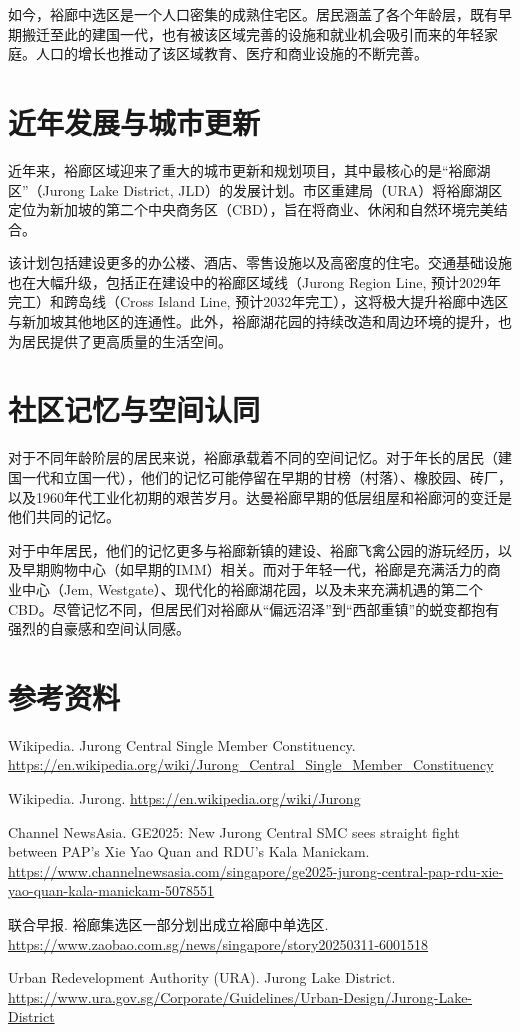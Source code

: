 \documentclass[11pt,a4paper,twoside,openany]{book}
\begin{document}
如今，裕廊中选区是一个人口密集的成熟住宅区。居民涵盖了各个年龄层，既有早期搬迁至此的建国一代，也有被该区域完善的设施和就业机会吸引而来的年轻家庭。人口的增长也推动了该区域教育、医疗和商业设施的不断完善。

\section{近年发展与城市更新}
近年来，裕廊区域迎来了重大的城市更新和规划项目，其中最核心的是“裕廊湖区”（Jurong Lake District, JLD）的发展计划。市区重建局（URA）将裕廊湖区定位为新加坡的第二个中央商务区（CBD），旨在将商业、休闲和自然环境完美结合。

该计划包括建设更多的办公楼、酒店、零售设施以及高密度的住宅。交通基础设施也在大幅升级，包括正在建设中的裕廊区域线（Jurong Region Line, 预计2029年完工）和跨岛线（Cross Island Line, 预计2032年完工），这将极大提升裕廊中选区与新加坡其他地区的连通性。此外，裕廊湖花园的持续改造和周边环境的提升，也为居民提供了更高质量的生活空间。

\section{社区记忆与空间认同}
对于不同年龄阶层的居民来说，裕廊承载着不同的空间记忆。对于年长的居民（建国一代和立国一代），他们的记忆可能停留在早期的甘榜（村落）、橡胶园、砖厂，以及1960年代工业化初期的艰苦岁月。达曼裕廊早期的低层组屋和裕廊河的变迁是他们共同的记忆。

对于中年居民，他们的记忆更多与裕廊新镇的建设、裕廊飞禽公园的游玩经历，以及早期购物中心（如早期的IMM）相关。而对于年轻一代，裕廊是充满活力的商业中心（Jem, Westgate）、现代化的裕廊湖花园，以及未来充满机遇的第二个CBD。尽管记忆不同，但居民们对裕廊从“偏远沼泽”到“西部重镇”的蜕变都抱有强烈的自豪感和空间认同感。

\section*{参考资料}
\begin{enumerate}[label={[\arabic*]},leftmargin=*,topsep=2pt,itemsep=1pt,parsep=0pt]
  \item Wikipedia. Jurong Central Single Member Constituency. \url{https://en.wikipedia.org/wiki/Jurong_Central_Single_Member_Constituency}
  \item Wikipedia. Jurong. \url{https://en.wikipedia.org/wiki/Jurong}
  \item Channel NewsAsia. GE2025: New Jurong Central SMC sees straight fight between PAP's Xie Yao Quan and RDU's Kala Manickam. \url{https://www.channelnewsasia.com/singapore/ge2025-jurong-central-pap-rdu-xie-yao-quan-kala-manickam-5078551}
  \item 联合早报. 裕廊集选区一部分划出成立裕廊中单选区. \url{https://www.zaobao.com.sg/news/singapore/story20250311-6001518}
  \item Urban Redevelopment Authority (URA). Jurong Lake District. \url{https://www.ura.gov.sg/Corporate/Guidelines/Urban-Design/Jurong-Lake-District}
\end{enumerate}
\end{document}

